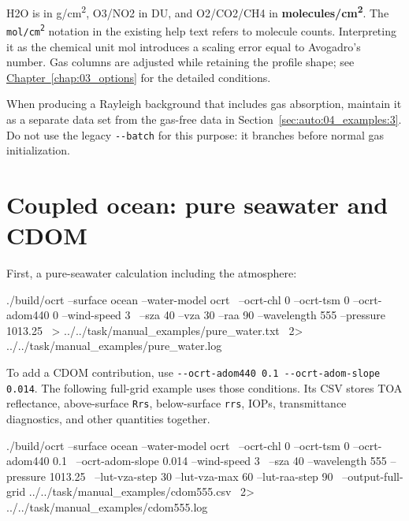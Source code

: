H2O is in g/cm\textsuperscript{2}, O3/NO2 in DU, and O2/CO2/CH4 in \textbf{molecules/cm\textsuperscript{2}}. The \texttt{mol/\allowbreak{}cm\textsuperscript{2}} notation in the existing help text refers to molecule counts. Interpreting it as the chemical unit mol introduces a scaling error equal to Avogadro's number. Gas columns are adjusted while retaining the profile shape; see \hyperref[chap:03_options]{Chapter~\ref*{chap:03_options}} for the detailed conditions.

When producing a Rayleigh background that includes gas absorption, maintain it as a separate data set from the gas-free data in Section~\ref{sec:auto:04_examples:3}. Do not use the legacy \texttt{-\allowbreak{}-\allowbreak{}batch} for this purpose: it branches before normal gas initialization.

\section{Coupled ocean: pure seawater and CDOM}
\label{sec:auto:04_examples:7}
First, a pure-seawater calculation including the atmosphere:


\par\noindent\begin{minipage}{\linewidth}
\begin{ManualCode}
./build/ocrt --surface ocean --water-model ocrt \
  --ocrt-chl 0 --ocrt-tsm 0 --ocrt-adom440 0 --wind-speed 3 \
  --sza 40 --vza 30 --raa 90 --wavelength 555 --pressure 1013.25 \
  > ../../task/manual_examples/pure_water.txt \
  2> ../../task/manual_examples/pure_water.log
\end{ManualCode}
\end{minipage}\par

To add a CDOM contribution, use \texttt{-\allowbreak{}-\allowbreak{}ocrt-\allowbreak{}adom440 0.\allowbreak{}1 -\allowbreak{}-\allowbreak{}ocrt-\allowbreak{}adom-\allowbreak{}slope 0.\allowbreak{}014}. The following full-grid example uses those conditions. Its CSV stores TOA reflectance, above-surface \texttt{Rrs}, below-surface \texttt{rrs}, IOPs, transmittance diagnostics, and other quantities together.


\par\noindent\begin{minipage}{\linewidth}
\begin{ManualCode}
./build/ocrt --surface ocean --water-model ocrt \
  --ocrt-chl 0 --ocrt-tsm 0 --ocrt-adom440 0.1 \
  --ocrt-adom-slope 0.014 --wind-speed 3 \
  --sza 40 --wavelength 555 --pressure 1013.25 \
  --lut-vza-step 30 --lut-vza-max 60 --lut-raa-step 90 \
  --output-full-grid ../../task/manual_examples/cdom555.csv \
  2> ../../task/manual_examples/cdom555.log
\end{ManualCode}
\end{minipage}\par

